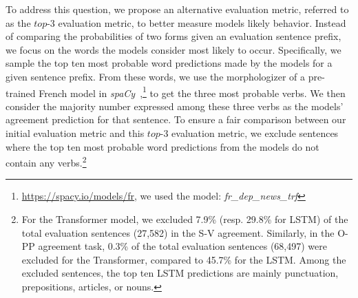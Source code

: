 To address this question, we propose an alternative evaluation metric, referred to as the $top$-3 evaluation metric, to better measure models likely behavior. Instead of comparing the probabilities of two forms given an evaluation sentence prefix, we focus on the words the models consider most likely to occur. Specifically, we sample the top ten most probable word predictions made by the models for a given sentence prefix. From these words, we use the morphologizer of a pre-trained French model in \textit{spaCy}~\citep{spacy},\footnote{\url{https://spacy.io/models/fr}, we used the model: \textit{fr\_dep\_news\_trf}} to get the three most probable verbs. We then consider the majority number expressed among these three verbs as the models' agreement prediction for that sentence. To ensure a fair comparison between our initial evaluation metric and this $top$-3 evaluation metric, we exclude sentences where the top ten most probable word predictions from the models do not contain any verbs.\footnote{For the Transformer model, we excluded 7.9\% (resp. 29.8\% for LSTM) of the total evaluation sentences (27,582) in the S-V agreement. Similarly, in the O-PP agreement task,  0.3\% of the total evaluation sentences (68,497) were excluded for the Transformer, compared to 45.7\% for the LSTM. Among the excluded sentences, the top ten LSTM predictions are mainly punctuation, prepositions, articles, or nouns. }
